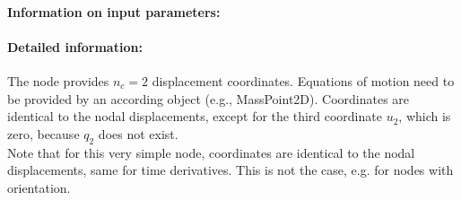 \paragraph{Information on input parameters:} 
\finishTable
 \noindent
    \paragraph{Detailed information:}
    The node provides $n_c=2$ displacement coordinates. Equations of motion need to be provided by an according object (e.g., MassPoint2D).
    Coordinates are identical to the nodal displacements, except for the third coordinate $u_2$, which is zero, because $q_2$ does not exist. \vspace{6pt}\\
    Note that for this very simple node, coordinates are identical to the nodal displacements, same for time derivatives. This is not the case, e.g. for nodes with orientation. \vspace{6pt}\\
    
